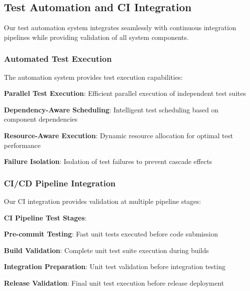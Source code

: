 \subsection*{Test Automation and CI Integration}

Our test automation system integrates seamlessly with continuous integration pipelines while providing validation of all system components.

\subsubsection*{Automated Test Execution}

The automation system provides test execution capabilities:

\begin{compactlist}
    \item \textbf{Parallel Test Execution}: Efficient parallel execution of independent test suites
    \item \textbf{Dependency-Aware Scheduling}: Intelligent test scheduling based on component dependencies
    \item \textbf{Resource-Aware Execution}: Dynamic resource allocation for optimal test performance
    \item \textbf{Failure Isolation}: Isolation of test failures to prevent cascade effects
\end{compactlist}

\subsubsection*{CI/CD Pipeline Integration}

Our CI integration provides validation at multiple pipeline stages:

\begin{alertbox}
\textbf{CI Pipeline Test Stages}:
\begin{compactlist}
    \item \textbf{Pre-commit Testing}: Fast unit tests executed before code submission
    \item \textbf{Build Validation}: Complete unit test suite execution during builds
    \item \textbf{Integration Preparation}: Unit test validation before integration testing
    \item \textbf{Release Validation}: Final unit test execution before release deployment
\end{compactlist}
\end{alertbox}

